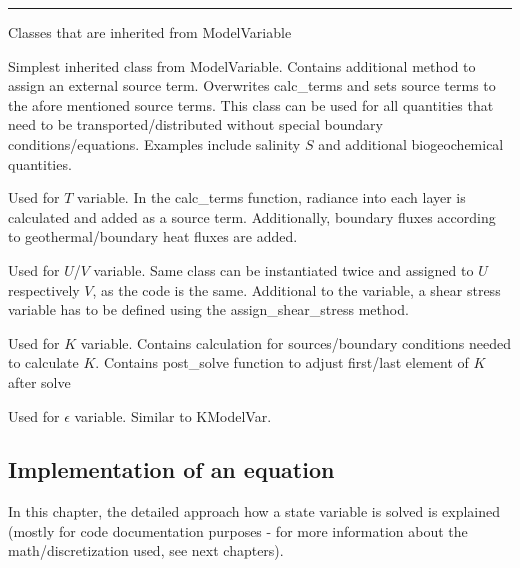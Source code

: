 \documentclass[paper=a4, fontsize=12pt]{article}
\begin{document}
\begin{description}[style=nextline]
 \hrule
\item[Model state variable classes] \noindent Classes that are inherited from ModelVariable
 \begin{description}[style=multiline, leftmargin=17em]
		\item[TranspModelVar] Simplest inherited class from ModelVariable.  Contains additional method to assign an external source term. Overwrites calc\_terms and sets source terms to the afore mentioned source terms. This class can be used for all quantities that need to be transported/distributed without special boundary conditions/equations. Examples include salinity $S$ and additional biogeochemical quantities.
		
		\item[TempModelVar] Used for $T$ variable. In the calc\_terms function, radiance into each layer is calculated and added as a source term. Additionally, boundary fluxes according to geothermal/boundary heat fluxes are added.
		
		\item[UVModelVar] Used for $U$/$V$ variable. Same class can be instantiated twice and assigned to $U$ respectively $V$, as the code is the same. Additional to the variable, a shear stress variable has to be defined using the assign\_shear\_stress method.
		
		\item[KModelVar] Used for $K$ variable. Contains calculation for sources/boundary conditions needed to calculate $K$. Contains post\_solve function to adjust first/last element of $K$ after solve

		\item[EpsModelVar] Used for $\epsilon$ variable. Similar to KModelVar.
\end{description}
\end{description}



\subsection{Implementation of an equation}
In this chapter, the detailed approach how a state variable is solved is explained (mostly for code documentation purposes - for more information about the math/discretization used, see next chapters).
\end{document}
